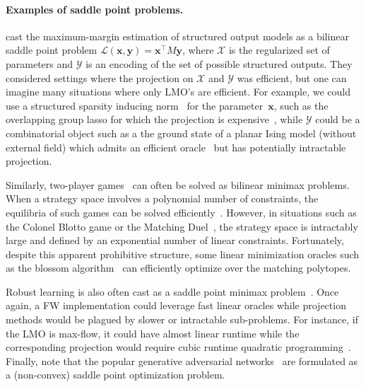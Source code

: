 \documentclass[twoside]{article}
\renewcommand{\L}{\mathcal{L}}
\newcommand{\X}{\mathcal{X}}
\newcommand{\Y}{\mathcal{Y}}
\newcommand{\x}{\bm{x}}
\newcommand{\y}{\bm{y}}
\newcommand{\0}{\mathbf{0}} %
\begin{document}
\paragraph{Examples of saddle point problems.} 
\citet{taskar2006dualExtrag} cast the maximum-margin estimation of structured output models as a bilinear saddle point problem $\L(\x,\y) = \x^\top M\y$, where $\X$ is the regularized set of parameters and $\Y$ is an encoding of the set of possible structured outputs. 
They considered settings where the projection on $\X$ and $\Y$ was efficient, but one can imagine many situations where only LMO's are efficient. 
For example, we could use a structured sparsity inducing norm~\citep{martins2011structuredSparsity} for the parameter~$\x$, such as the overlapping group lasso for which the projection is expensive~\citep{bach2012structuredSparsity}, while $\Y$ could be a combinatorial object such as a the ground state of a planar Ising model (without external field) which admits an efficient oracle~\citep{barahona1982} but has potentially intractable projection.

Similarly, two-player games~\citep{von2007theory} can often be solved as bilinear minimax problems. 
When a strategy space involves a polynomial number of constraints, the equilibria of such games can be solved efficiently~\citep{koller1994}. 
However, in situations such as the Colonel Blotto game or the Matching Duel~\citep{ahmadinejad2016}, the strategy space is intractably large and defined by an exponential number of linear constraints. 
Fortunately, despite this apparent prohibitive structure, some linear minimization oracles such as the blossom algorithm~\citep{edmonds1965} can efficiently optimize over the matching polytopes.
%

Robust learning is also often cast as a saddle point minimax problem~\citep{KimMagBoy05}. 
Once again, a FW implementation could leverage fast linear oracles while projection methods would be plagued by slower or intractable sub-problems. 
For instance, if the LMO is max-flow, it could have almost linear runtime while the corresponding projection would require cubic runtime quadratic programming~\citep{Kelner2014}.
Finally, note that the popular generative adversarial networks~\citep{goodfellow14GAN} are formulated as a (non-convex) saddle point optimization problem.

\vspace{-2mm}
\end{document}
